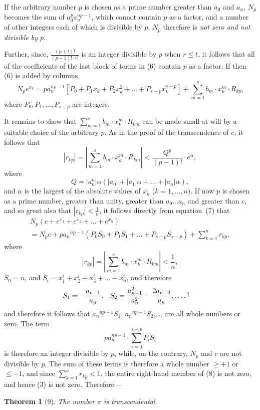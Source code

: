 \documentclass[a4paper,12pt]{book}[2004/02/16]
\providecommand{\leqq}{\leq}
\providecommand{\geqq}{\geq}
\providecommand{\colorbox}[2]{#2}
\newcommand{\correction}[2]{\colorbox{corr}{#1}}
\providecommand{\hyperlink}[2]{#2}
\providecommand{\hypertarget}[2]{#2}
\theoremstyle{ilemma}
\theoremstyle{itheorem}
\newtheorem{theorem}{Theorem}
\theoremstyle{iother}
\theoremstyle{icorollary}
\theoremstyle{numcorollary}
\theoremstyle{idefinition}
\renewcommand{\dfrac}[2]{\frac{#1}{#2}}%
\begin{document}
If the arbitrary number $p$ is chosen as a prime number greater than
$a_0$ and $a_n$, $N_p$ becomes the sum of $a_0^pa_n^{np-1}$, which
cannot contain $p$ as a factor, and a number of other integers each of
which is divisible by $p$. $N_p$ therefore is \textit{not zero and not
divisible by $p$}.

Further, since, $\dfrac{(p+t)!}{(p-1)!\cdot r!}$ is an integer
divisible by $p$ when $r \leqq t$, it follows that all of the
coefficients of the last block of terms in \hyperlink{eq6p27}{(6)} contain $p$ as a
factor. If then \hyperlink{eq6p27}{(6)} is added by columns,
\hypertarget{eq7p28}{\[
  N_pe^{\text{\correction{$x_k$}{$xk$}}} = pa_n^{np-1} \left[
  P_0 + P_1x_k + P_2x_k^2 + \ldots + P_{s-p}x_k^{s-p} \right]
  + \sum_{m=1}^s b_m\cdot x_k^m \cdot R_{km}
\tag{7}
\]}
where $P_0,P_1,\ldots,P_{s-p}$ are integers.

It remains to show that $\sum_{m=1}^s b_m \cdot x_k^m \cdot R_{km}$
can be made small at will by a suitable choice of the arbitrary
$p$. As in the proof of the transcendence of $e$, it follows that
\[
  \left|r_{kp} \right|
  = \left|\sum_{m=1}^s b_m \cdot x_k^m \cdot R_{km} \right|
  < \frac{Q^p}{(p-1)!} \cdot e^\alpha,
\]
where
\[
  Q = |a_n^n|
      \alpha(|a_0|+ |a_1|\alpha + \ldots
            + |a_n|\alpha ),
\]
and $\alpha$ is the largest of the absolute values of $x_k$ ($k=1,
\ldots, n$).  If now $p$ is chosen as a prime number, greater than
unity, greater than $a_0 \ldots a_n$ and greater than $c$, and so
great also that $|r_{kp}|< \dfrac{1}{n}$, it follows directly from
equation~\hyperlink{eq7p28}{(7)} that
\begin{multline*}
\hypertarget{eq8p29}{\tag{8}
   N_p(c + e^{x_1} + e^{x_2} + \ldots + e^{x_n})}
\\
  = N_pc + p{a_n}^{np-1}
  (P_0S_0 + P_1S_1 + \ldots + P_{s-p}S_{s-p}) +
  \sum_{k=1}^n r_{kp},
\end{multline*}
where
\[
  |r_{kp}|
  = \left|\sum_{m=1}^s b_m \cdot x_k^m \cdot R_{km} \right|
  < \frac1n,
\]
$S_0=n$,  and  $S_i=x_1^i + x_2^i + x_3^i + \ldots +
  x_n^i$, and therefore
\begin{align*}
  S_1 &=-\frac{a_{n-1}}{a_n},
  &S_2 &= \frac{a_{n-1}^2}{a_n^2}-\frac{2a_{n-2}}{a_n},\ldots,
\footnotemark
\end{align*}
and therefore it follows that ${a_n}^{np-1}S_1$,
${a_n}^{np-1}S_2$,\ldots, are all whole numbers or zero. The term
\[
   pa_n^{np-1} \cdot \sum_{i=0}^{s-p} P_iS_i
\]
is therefore an integer divisible by $p$, while, on the contrary,
$N_p$ and $c$ are not divisible by $p$. The sum of these terms is
therefore a whole number $\geqq +1$ or $\leqq-1$, and since
$\displaystyle \sum_{k=1}^nr_{kp} < 1$, the entire right-hand member
of \hyperlink{eq8p29}{(8)} is not zero, and hence \hyperlink{eq3p25}{(3)} is not zero. Therefore---
\begin{theorem}[9]\hypertarget{thm9}{}
The number $\pi$ is transcendental.
\end{theorem}
\end{document}
